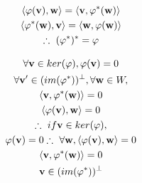 \documentclass[1]{mathtoolkit}
\begin{document}
\begin{p}
  \item
    \begin{subp}
      \item
        \begin{gather}
          \ip{\varphi(\vec{v})}{\vec{w}} = \ip{\vec{v}}{\varphi^*(\vec{w})} \\
          \ip{\varphi^*(\vec{w})}{\vec{v}} = \ip{\vec{w}}{\varphi(\vec{w})} \\
          \therefore (\varphi^*)^* = \varphi
        \end{gather}
      \item
        \begin{gather}
          \forall \vec{v} \in ker(\varphi), \varphi(\vec{v}) = 0 \\
          \forall \vec{v'} \in (im(\varphi^*))^\perp, \forall \vec{w} \in W, \\
          \ip{\vec{v}}{\varphi^*(\vec{w})} = 0 \\
          \ip{\varphi(\vec{v})}{\vec{w}} = 0 \\
          \therefore if \vec{v} \in ker(\varphi), \\
          \varphi(\vec{v}) = 0
          \therefore \forall \vec{w}, \ip{\varphi(\vec{v})}{\vec{w}} = 0 \\
                                      \ip{\vec{v}}{\varphi^*(\vec{w})} = 0 \\
                                      \vec{v} \in (im(\varphi^*))^\perp \\
        \end{gather}
    \end{subp}
\end{p}
\end{document}
